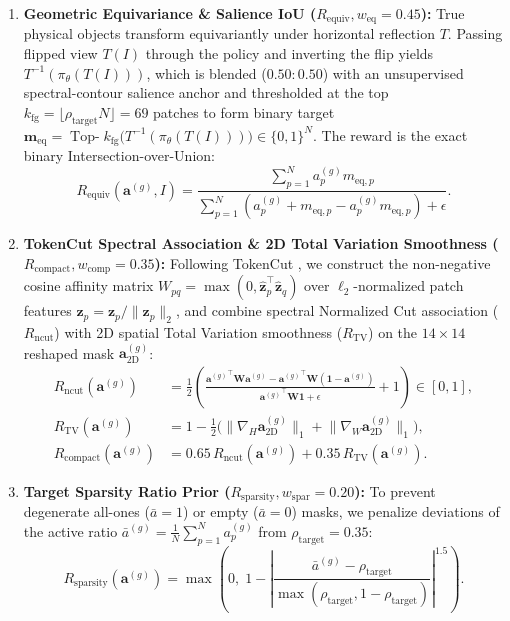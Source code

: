 \documentclass[11pt,a4paper]{article}
\begin{document}
\begin{enumerate}[leftmargin=*]
    \item \textbf{Geometric Equivariance \& Salience IoU ($R_{\text{equiv}}, w_{\text{eq}}=0.45$):} True physical objects transform equivariantly under horizontal reflection $T$. Passing flipped view $T(I)$ through the policy and inverting the flip yields $T^{-1}(\pi_\theta(T(I)))$, which is blended ($0.50 : 0.50$) with an unsupervised spectral-contour salience anchor and thresholded at the top $k_{\text{fg}} = \lfloor \rho_{\text{target}} N \rfloor = 69$ patches to form binary target $\mathbf{m}_{\text{eq}} = \operatorname{Top-}k_{\text{fg}}\!\big(T^{-1}(\pi_\theta(T(I)))\big) \in \{0, 1\}^N$. The reward is the exact binary Intersection-over-Union:
    \begin{equation}
    R_{\text{equiv}}(\mathbf{a}^{(g)}, I) = \frac{\sum_{p=1}^N a_p^{(g)} m_{\text{eq}, p}}{\sum_{p=1}^N \left(a_p^{(g)} + m_{\text{eq}, p} - a_p^{(g)} m_{\text{eq}, p}\right) + \epsilon}.
    \label{eq:equiv_reward}
    \end{equation}
    \item \textbf{TokenCut Spectral Association \& 2D Total Variation Smoothness ($R_{\text{compact}}, w_{\text{comp}}=0.35$):} Following TokenCut \cite{wang2022tokencut}, we construct the non-negative cosine affinity matrix $W_{pq} = \max(0, \hat{\mathbf{z}}_p^\top \hat{\mathbf{z}}_q)$ over $\ell_2$-normalized patch features $\hat{\mathbf{z}}_p = \mathbf{z}_p / \|\mathbf{z}_p\|_2$, and combine spectral Normalized Cut association ($R_{\text{ncut}}$) with 2D spatial Total Variation smoothness ($R_{\text{TV}}$) on the $14\times 14$ reshaped mask $\mathbf{a}_{2\text{D}}^{(g)}$:
    \begin{align}
    R_{\text{ncut}}(\mathbf{a}^{(g)}) &= \frac{1}{2}\!\left(\frac{{\mathbf{a}^{(g)}}^\top \mathbf{W} \mathbf{a}^{(g)} - {\mathbf{a}^{(g)}}^\top \mathbf{W} (\mathbf{1} - \mathbf{a}^{(g)})}{{\mathbf{a}^{(g)}}^\top \mathbf{W} \mathbf{1} + \epsilon} + 1\right) \in [0, 1], \label{eq:ncut} \\
    R_{\text{TV}}(\mathbf{a}^{(g)}) &= 1 - \frac{1}{2}\Big(\big\|\nabla_H \mathbf{a}_{2\text{D}}^{(g)}\big\|_1 + \big\|\nabla_W \mathbf{a}_{2\text{D}}^{(g)}\big\|_1\Big), \label{eq:tv_smooth} \\
    R_{\text{compact}}(\mathbf{a}^{(g)}) &= 0.65\,R_{\text{ncut}}(\mathbf{a}^{(g)}) + 0.35\,R_{\text{TV}}(\mathbf{a}^{(g)}). \label{eq:compactness}
    \end{align}
    \item \textbf{Target Sparsity Ratio Prior ($R_{\text{sparsity}}, w_{\text{spar}}=0.20$):} To prevent degenerate all-ones ($\bar{a}=1$) or empty ($\bar{a}=0$) masks, we penalize deviations of the active ratio $\bar{a}^{(g)} = \frac{1}{N}\sum_{p=1}^N a_p^{(g)}$ from $\rho_{\text{target}} = 0.35$:
    \begin{equation}
    R_{\text{sparsity}}(\mathbf{a}^{(g)}) = \max\!\left(0, \; 1 - \left|\frac{\bar{a}^{(g)} - \rho_{\text{target}}}{\max(\rho_{\text{target}}, 1 - \rho_{\text{target}})}\right|^{1.5}\right).
    \label{eq:sparsity_reward}
    \end{equation}
\end{enumerate}
\end{document}
